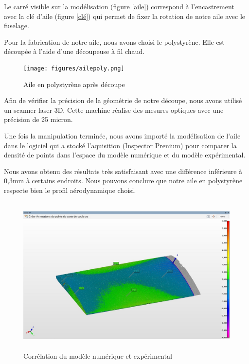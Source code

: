 \documentclass[a4paper,12pt,french]{report}
\begin{document}
Le carré visible sur la modélisation (figure \ref{aile}) correspond à l'encastrement avec la clé d'aile (figure \ref{clé}) qui permet de fixer la rotation de notre aile avec le fuselage.\newline

Pour la fabrication de notre aile, nous avons choisi le polystyrène. Elle est découpée à l'aide d'une découpeuse à fil chaud.

\begin{figure}[h]
    \centering
    \texttt{[image: figures/ailepoly.png]}
    \caption{Aile en polystyrène après découpe}
    \label{ailepoly}
\end{figure}

\newpage
Afin de vérifier la précision de la géométrie de notre découpe, nous avons utilisé un scanner laser 3D. Cette machine réalise des mesures optiques avec une précision de 25 micron.\newline

Une fois la manipulation terminée, nous avons importé la modélisation de l'aile dans le logiciel qui a stocké l'aquisition (Inspector Prenium) pour comparer la densité de points dans l'espace du modèle numérique et du modèle expérimental.\newline

Nous avons obtenu des résultats très satisfaisant avec une différence inférieure à 0,3mm à certains endroits. Nous pouvons conclure que notre aile en polystyrène respecte bien le profil aérodynamique choisi.

\begin{figure}[h]
    \centering
    \includegraphics[height=8cm]{figures/geo.jpg}
    \caption{Corrélation du modèle numérique et expérimental}
    \label{ailepoly}
\end{figure}
\end{document}
